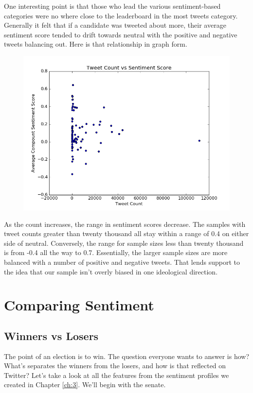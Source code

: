 \documentclass[11pt, twoside, reqno]{book}
\begin{document}
One interesting point is that those who lead the various sentiment-based categories were no where close to the leaderboard in the most tweets category. Generally it felt that if a candidate was tweeted about more, their average sentiment score tended to drift towards neutral with the positive and negative tweets balancing out. Here is that relationship in graph form. 
\begin{figure}[H]
\centering
	\includegraphics[scale=0.5]{count_sentiment}
\end{figure}
As the count increases, the range in sentiment scores decrease. The samples with tweet counts greater than twenty thousand all stay within a range of 0.4 on either side of neutral. Conversely, the range for sample sizes less than twenty thousand is from -0.4 all the way to 0.7. Essentially, the larger sample sizes are more balanced with a number of positive and negative tweets. That lends support to the idea that our sample isn't overly biased in one ideological direction. 
\section{Comparing Sentiment}

\subsection{Winners vs Losers}
\hspace{0.2in}The point of an election is to win. The question everyone wants to answer is how? What's separates the winners from the losers, and how is that reflected on Twitter? Let's take a look at all the features from the sentiment profiles we created in Chapter \ref{ch:3}. We'll begin with the senate. 
\end{document}
